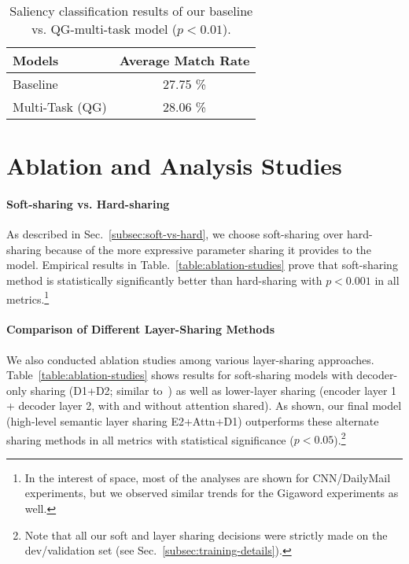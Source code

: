 \documentclass[11pt,a4paper]{article}
\begin{document}
\begin{table}[t]
\begin{small}
\begin{center}
\begin{tabular}{|l|c|}
\hline
Models & Average Match Rate \\
\hline
Baseline & 27.75 \% \\
Multi-Task (QG) & 28.06 \% \\
\hline
\end{tabular}
\end{center}
\vspace{-10pt}
\caption{Saliency classification results of our baseline vs. QG-multi-task model ($p<0.01$).}
\label{table:saliency_results_2}
\vspace{-4pt}
\end{small}
\end{table}


\section{Ablation and Analysis Studies}
\label{sec:analysis}


\paragraph{Soft-sharing vs. Hard-sharing}
As described in Sec.~\ref{subsec:soft-vs-hard}, we choose soft-sharing over hard-sharing because of the more expressive parameter sharing it provides to the model. Empirical results in Table.~\ref{table:ablation-studies} prove that soft-sharing method is statistically significantly better than hard-sharing with $p < 0.001$ in all metrics.\footnote{In the interest of space, most of the analyses are shown for CNN/DailyMail experiments, but we observed similar trends for the Gigaword experiments as well.}



\paragraph{Comparison of Different Layer-Sharing Methods}
We also conducted ablation studies among various layer-sharing approaches. Table~\ref{table:ablation-studies} shows results for soft-sharing models with decoder-only sharing (D1+D2; similar to~) as well as lower-layer sharing (encoder layer 1 + decoder layer 2, with and without attention shared). As shown, our final model (high-level semantic layer sharing E2+Attn+D1) outperforms these alternate sharing methods in all metrics with statistical significance ($p<0.05$).\footnote{Note that all our soft and layer sharing decisions were strictly made on the dev/validation set (see Sec.~\ref{subsec:training-details}).}
\end{document}
